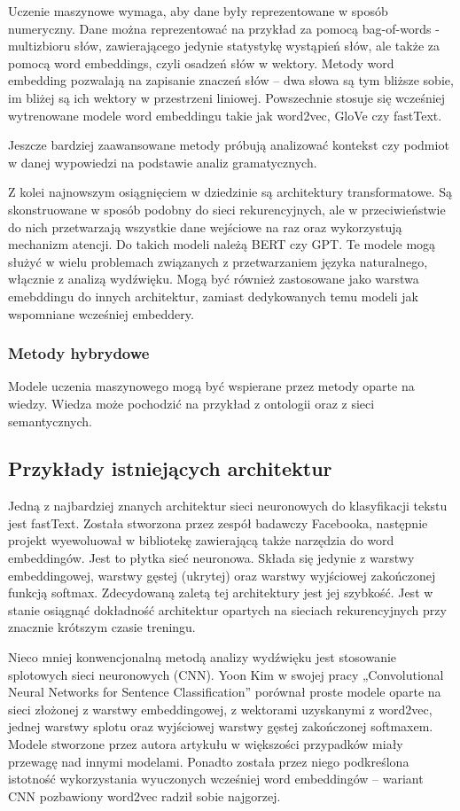 Uczenie maszynowe wymaga, aby dane były reprezentowane w sposób numeryczny. Dane można 
reprezentować na przykład za pomocą bag-of-words - multizbioru słów, zawierającego jedynie
statystykę wystąpień słów, ale także za pomocą word embeddings, czyli osadzeń słów w wektory.
Metody word embedding pozwalają na zapisanie znaczeń słów -- dwa słowa są tym bliższe sobie,
im bliżej są ich wektory w przestrzeni liniowej. Powszechnie stosuje się wcześniej wytrenowane
modele word embeddingu takie jak word2vec\cite{word2vec}, GloVe\cite{glove} czy fastText\cite{fasttext-vectors}.

Jeszcze bardziej zaawansowane metody próbują analizować kontekst czy podmiot w danej wypowiedzi
na podstawie analiz gramatycznych.

Z kolei najnowszym osiągnięciem w dziedzinie są architektury transformatowe\cite{transformers}. Są skonstruowane
w sposób podobny do sieci rekurencyjnych, ale w przeciwieństwie do nich przetwarzają wszystkie
dane wejściowe na raz oraz wykorzystują mechanizm atencji. Do takich modeli należą BERT\cite{bert} czy
GPT\cite{gpt}. Te modele mogą służyć w wielu problemach związanych z przetwarzaniem języka naturalnego,
włącznie z analizą wydźwięku. Mogą być również zastosowane jako warstwa emebddingu do innych
architektur, zamiast dedykowanych temu modeli jak wspomniane wcześniej embeddery.

\subsubsection{Metody hybrydowe}
Modele uczenia maszynowego mogą być wspierane przez metody oparte na wiedzy. Wiedza może
pochodzić na przykład z ontologii oraz z sieci semantycznych.

\subsection{Przykłady istniejących architektur}
Jedną z najbardziej znanych architektur sieci neuronowych do klasyfikacji tekstu
jest fastText\cite{fasttext-classification}. Została stworzona przez zespół badawczy Facebooka, następnie projekt wyewoluował
w bibliotekę zawierającą także narzędzia do word embeddingów. Jest to płytka sieć neuronowa.
Składa się jedynie z warstwy embeddingowej, warstwy gęstej (ukrytej) oraz warstwy wyjściowej
zakończonej funkcją softmax. Zdecydowaną zaletą tej architektury jest jej szybkość. Jest
w stanie osiągnąć dokładność architektur opartych na sieciach rekurencyjnych przy znacznie
krótszym czasie treningu.

Nieco mniej konwencjonalną metodą analizy wydźwięku jest stosowanie splotowych
sieci neuronowych (CNN). Yoon Kim w swojej pracy „Convolutional Neural Networks for Sentence 
Classification”\cite{cnn} porównał proste modele oparte na sieci złożonej z warstwy embeddingowej,
z wektorami uzyskanymi z word2vec, jednej warstwy splotu oraz wyjściowej warstwy
gęstej zakończonej softmaxem. Modele stworzone przez autora artykułu w większości
przypadków miały przewagę nad innymi modelami. Ponadto została przez niego podkreślona istotność
wykorzystania wyuczonych wcześniej word embeddingów -- wariant CNN pozbawiony word2vec
radził sobie najgorzej.
